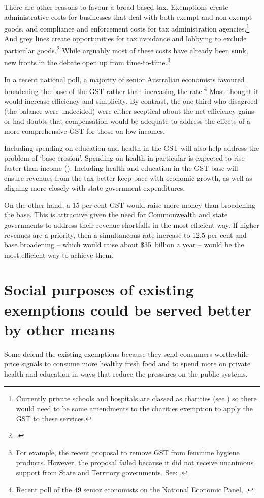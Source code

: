 There are other reasons to favour a broad-based tax. Exemptions create administrative costs for businesses that deal with both exempt and non-exempt goods, and compliance and enforcement costs for tax administration agencies.\footnote{Currently private schools and hospitals are classed as charities (see \textcite{ACNC2015}) so there would need to be some amendments to the charities exemption to apply the GST to these services.}  And grey lines create opportunities for tax avoidance and lobbying to exclude particular goods.\footcite{Freebairn2015}  While arguably most of these costs have already been sunk, new fronts in the debate open up from time-to-time.\footnote{For example, the recent proposal to remove GST from feminine hygiene products. However, the proposal failed because it did not receive unanimous support from State and Territory governments. See: \textcite{Hockey2015-Federal-Finance-Relations}.}  

In a recent national poll, a majority of senior Australian economists favoured broadening the base of the GST rather than increasing the rate.\footnote{Recent poll of the 49 senior economists on the National Economic Panel, \textcite{NationalEconomicSocietyAustralia2015-GST}.}  Most thought it would increase efficiency and simplicity. By contrast, the one third who disagreed (the balance were undecided) were either sceptical about the net efficiency gains or had doubts that compensation would be adequate to address the effects of a more comprehensive GST for those on low incomes.

Including spending on education and health in the GST will also help address the problem of ‘base erosion’. Spending on health in particular is expected to rise faster than income (). Including health and education in the GST base will ensure revenues from the tax better keep pace with economic growth, as well as aligning more closely with state government expenditures. 

On the other hand, a 15 per cent GST would raise more money than broadening the base. This is attractive given the need for Commonwealth and state governments to address their revenue shortfalls in the most efficient way. If higher revenues are a priority, then a simultaneous rate increase to 12.5 per cent and base broadening – which would raise about \$35~billion a year – would be the most efficient way to achieve them. 

\section{Social purposes of existing exemptions could be served better by other means\label{sec:GST-2-4}}
Some defend the existing exemptions because they send consumers worthwhile price signals to consume more healthy fresh food and to spend more on private health and education in ways that reduce the pressures on the public systems. 


